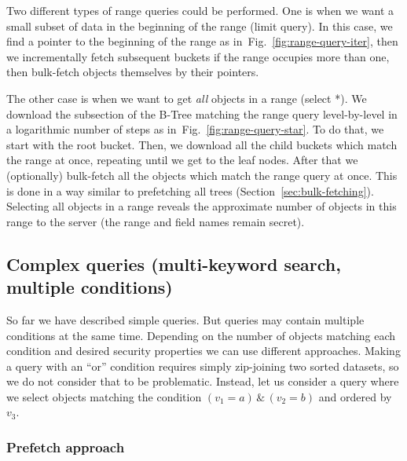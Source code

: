 \documentclass[notitlepage,longbibliography]{revtex4-1}
\newcommand{\figref}[1]{Fig.~\ref{#1}}
\begin{document}
Two different types of range queries could be performed.
One is when we want a small subset of data in the beginning of the range (limit query).
In this case, we find a pointer to the beginning of the range as in~\figref{fig:range-query-iter}, then we incrementally fetch subsequent buckets if the range occupies more than one, then bulk-fetch objects themselves by their pointers.

The other case is when we want to get \emph{all} objects in a range (select *).
We download the subsection of the B-Tree matching the range query level-by-level in a logarithmic number of steps as in~\figref{fig:range-query-star}.
To do that, we start with the root bucket.
Then, we download all the child buckets which match the range at once, repeating until we get to the leaf nodes.
After that we (optionally) bulk-fetch all the objects which match the range query at once.
This is done in a way similar to prefetching all trees (Section~\ref{sec:bulk-fetching}).
Selecting all objects in a range reveals the approximate number of objects in this range to the server (the range and field names remain secret).

\subsection{Complex queries (multi-keyword search, multiple conditions)}  %

So far we have described simple queries.
But queries may contain multiple conditions at the same time.
Depending on the number of objects matching each condition and desired security properties we can use different approaches.
Making a query with an ``or'' condition requires simply zip-joining two sorted datasets, so we do not consider that to be problematic.
Instead, let us consider a query where we select objects matching the condition $(v_1 = a) \,\&\, (v_2 = b)$ and ordered by $v_3$.

\subsubsection{Prefetch approach}
\label{sec:prefetch}
%
\end{document}
